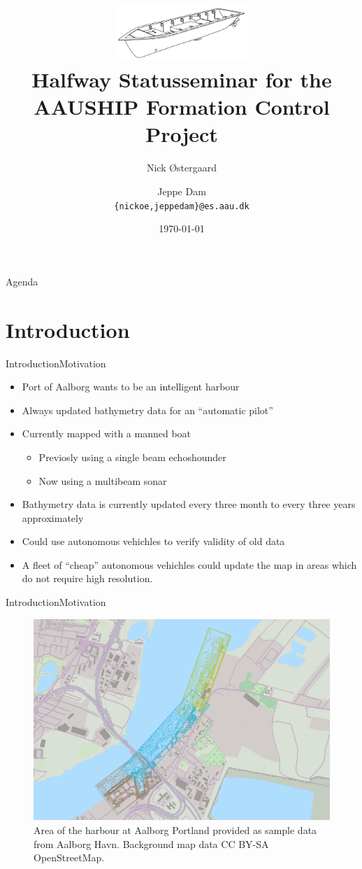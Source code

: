 \documentclass[10pt,handout]{beamer}
\title[AAUSHIP\\ Formation Control]%
{\includegraphics[width=5cm]{../thesis/frontmatter/aauship}\\ Halfway Statusseminar for the\\ AAUSHIP Formation Control Project}
\author[14gr1034]{%
  Nick Østergaard \and Jeppe Dam\\
  {{\tt \{nickoe,jeppedam\}@es.aau.dk}}
}
\institute[
  Dept.\ of Electronic Systems,\\
  Aalborg University,\\
  Denmark
] %
{%
  Department of Electronic Systems,\\
  Aalborg University,\\
  Denmark
  
}
\date{\today}
\begin{document}
\begin{frame}[plain] %
  \titlepage
\end{frame}

\begin{frame}{Agenda}{}
\tableofcontents
\end{frame}
\section{Introduction}
\begin{frame}{Introduction}{Motivation}
  \begin{itemize}
    \item Port of Aalborg wants to be an intelligent harbour
    \item Always updated bathymetry data for an ``automatic pilot''
    \item Currently mapped with a manned boat
    \begin{itemize}
      \item Previosly using a single beam echoshounder
      \item Now using a multibeam sonar
    \end{itemize}
    \item Bathymetry data is currently updated every three month to every three years approximately
    \item Could use autonomous vehichles to verify validity of old data
    \item A fleet of ``cheap'' autonomous vehichles could update the map in areas which do not require high resolution.
  \end{itemize}
\end{frame}

\begin{frame}{Introduction}{Motivation}
  \begin{figure}
	  \includegraphics[width=\textwidth]{../thesis/fig/use-case-data}
	  \caption{\scriptsize Area of the harbour at Aalborg Portland provided as sample
	  data from Aalborg Havn. Background map data CC BY-SA OpenStreetMap.}
	  \label{fig:diffforms}
  \end{figure}
\end{frame}
\end{document}
